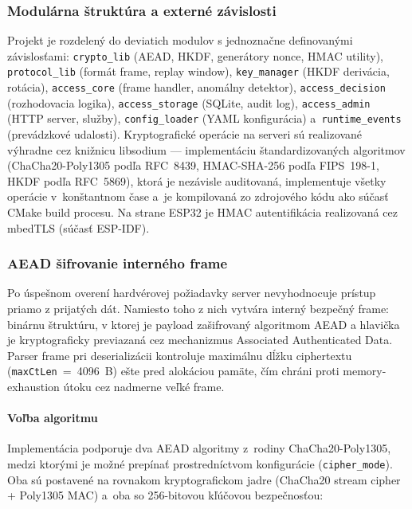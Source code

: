 \subsubsection{Modulárna štruktúra a externé závislosti}

Projekt je rozdelený do deviatich modulov s jednoznačne definovanými závislosťami: \texttt{crypto\_lib} (AEAD, HKDF, generátory nonce, HMAC utility), \texttt{protocol\_lib} (formát frame, replay window), \texttt{key\_manager} (HKDF derivácia, rotácia), \texttt{access\_core} (frame handler, anomálny detektor), \texttt{access\_decision} (rozhodovacia logika), \texttt{access\_storage} (SQLite, audit log), \texttt{access\_admin} (HTTP server, služby), \texttt{config\_loader} (YAML konfigurácia) a~\texttt{runtime\_events} (prevádzkové udalosti). Kryptografické operácie na serveri sú realizované výhradne cez knižnicu libsodium\cite{LibsodiumDoc} --- implementáciu štandardizovaných algoritmov (ChaCha20-Poly1305 podľa RFC~8439\cite{RFC8439}, HMAC-SHA-256 podľa FIPS~198-1\cite{FIPS1981}, HKDF podľa RFC~5869\cite{RFC5869}), ktorá je nezávisle auditovaná\cite{LibsodiumAudit}, implementuje všetky operácie v~konštantnom čase a~je kompilovaná zo zdrojového kódu ako súčasť CMake build procesu. Na strane ESP32 je HMAC autentifikácia realizovaná cez mbedTLS (súčasť ESP-IDF).

\subsubsection{AEAD šifrovanie interného frame}

Po úspešnom overení hardvérovej požiadavky server nevyhodnocuje prístup priamo z prijatých dát. Namiesto toho z nich vytvára interný bezpečný frame: binárnu štruktúru, v ktorej je payload zašifrovaný algoritmom AEAD a hlavička je kryptograficky previazaná cez mechanizmus Associated Authenticated Data. Parser frame pri deserializácii kontroluje maximálnu dĺžku ciphertextu (\texttt{maxCtLen}~=~4096~B) ešte pred alokáciou pamäte, čím chráni proti memory-exhaustion útoku cez nadmerne veľké frame.

\paragraph{Voľba algoritmu}

Implementácia podporuje dva AEAD algoritmy z~rodiny ChaCha20-Poly1305, medzi ktorými je možné prepínať prostredníctvom konfigurácie (\texttt{cipher\_mode}). Oba sú postavené na rovnakom kryptografickom jadre (ChaCha20 stream cipher + Poly1305 MAC) a~oba so 256-bitovou kľúčovou bezpečnosťou:

